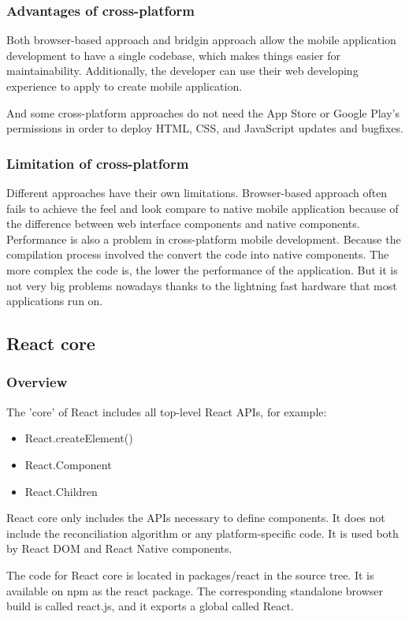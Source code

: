 \subsubsection{Advantages of cross-platform}
\par{
	Both browser-based approach and bridgin approach allow the mobile application development to have a single codebase, which makes things easier for maintainability. Additionally, the developer can use their web developing experience to apply to create mobile application.

	And some cross-platform approaches do not need the App Store or Google Play's permissions in order to deploy HTML, CSS, and JavaScript updates and bugfixes.
}

\subsubsection{Limitation of cross-platform}
\par{
	Different approaches have their own limitations. Browser-based approach often fails to achieve the feel and look compare to native mobile application because of the difference between web interface components and native components.
	Performance is also a problem in cross-platform mobile development. Because the compilation process involved the convert the code into native components. The more complex the code is, the lower the performance of the application. But it is not very big problems nowadays thanks to the lightning fast hardware that most applications run on.
}
\subsection{React core}
\subsubsection{Overview}
\par{
	The 'core' of React includes all top-level React APIs, for example:
	\begin{itemize}
		\item  React.createElement()
		\item  React.Component
		\item  React.Children
	\end{itemize}

	React core only includes the APIs necessary to define components. It does not include the reconciliation algorithm or any platform-specific code. It is used both by React DOM and React Native components.

	The code for React core is located in packages/react in the source tree. It is available on npm as the react package. The corresponding standalone browser build is called react.js, and it exports a global called React.
}
